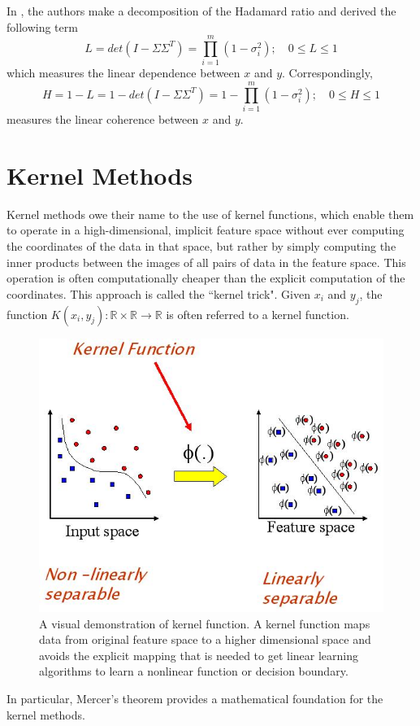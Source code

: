 \documentclass[12pt]{report} %
\begin{document}
In \cite{ECCA}, the authors make a decomposition of the Hadamard ratio and derived the following term
\begin{equation}
L=det(I-\Sigma\Sigma^T)=\prod_{i=1}^{m}(1-\sigma_{i}^2);\quad 0\leq L\leq 1
\end{equation}
which measures the linear dependence between $x$ and $y$. Correspondingly,
\begin{equation}
H=1-L=1-det(I-\Sigma\Sigma^T)=1-\prod_{i=1}^{m}(1-\sigma_{i}^2);\quad 0\leq H\leq 1
\end{equation}
measures the linear coherence between $x$ and $y$.

\section{Kernel Methods}
Kernel methods owe their name to the use of kernel functions, which enable them to operate in a high-dimensional, implicit feature space without ever computing the coordinates of the data in that space, but rather by simply computing the inner products between the images of all pairs of data in the feature space. This operation is often computationally cheaper than the explicit computation of the coordinates. This approach is called the ``kernel trick"\cite{PR}. Given $x_{i}$ and $y_{j}$, the function $K(x_{i},y_{j}): \mathbb{R} \times \mathbb{R} \to \mathbb{R}$ is often referred to a kernel function.
\begin{figure}[H]
	\centering
	\includegraphics[scale=0.6]{pictures/kernel.jpg}
	\caption{A visual demonstration of kernel function. A kernel function maps data from original feature space to a higher dimensional space and avoids the explicit mapping that is needed to get linear learning algorithms to learn a nonlinear function or decision boundary\cite{KPIC}.}
	\label{fig:4}
\end{figure}
In particular, Mercer's theorem\cite{MT} provides a mathematical foundation for the kernel methods. 
\end{document}
